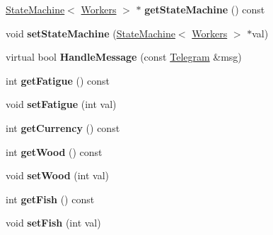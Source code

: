 \begin{DoxyCompactItemize}
\item 
\hypertarget{class_workers_a795643f5e05c591d4172f212ec77da90}{}\hyperlink{class_state_machine}{State\+Machine}$<$ \hyperlink{class_workers}{Workers} $>$ $\ast$ {\bfseries get\+State\+Machine} () const \label{class_workers_a795643f5e05c591d4172f212ec77da90}

\item 
\hypertarget{class_workers_a08cdcac34f5d3225b5faa5276ddc46ef}{}void {\bfseries set\+State\+Machine} (\hyperlink{class_state_machine}{State\+Machine}$<$ \hyperlink{class_workers}{Workers} $>$ $\ast$val)\label{class_workers_a08cdcac34f5d3225b5faa5276ddc46ef}

\item 
\hypertarget{class_workers_ae524c2a46d4c48ad5efcde956af6efe9}{}virtual bool {\bfseries Handle\+Message} (const \hyperlink{struct_telegram}{Telegram} \&msg)\label{class_workers_ae524c2a46d4c48ad5efcde956af6efe9}

\item 
\hypertarget{class_workers_aa0c46bd565afdb6652cf2f16b4ee221d}{}int {\bfseries get\+Fatigue} () const \label{class_workers_aa0c46bd565afdb6652cf2f16b4ee221d}

\item 
\hypertarget{class_workers_abb20740ab6c10e755c2a26896ec989a7}{}void {\bfseries set\+Fatigue} (int val)\label{class_workers_abb20740ab6c10e755c2a26896ec989a7}

\item 
\hypertarget{class_workers_a8f583ae979d5fd3dd80e5c59cd73d090}{}int {\bfseries get\+Currency} () const \label{class_workers_a8f583ae979d5fd3dd80e5c59cd73d090}

\item 
\hypertarget{class_workers_ac13a6bea46802080e06c0882382516dd}{}int {\bfseries get\+Wood} () const \label{class_workers_ac13a6bea46802080e06c0882382516dd}

\item 
\hypertarget{class_workers_a06bcad061d17843b5fb5728ee66ab175}{}void {\bfseries set\+Wood} (int val)\label{class_workers_a06bcad061d17843b5fb5728ee66ab175}

\item 
\hypertarget{class_workers_a7fdce044f9736c88cf0831c9efa9db5b}{}int {\bfseries get\+Fish} () const \label{class_workers_a7fdce044f9736c88cf0831c9efa9db5b}

\item 
\hypertarget{class_workers_a6ae83f7822640cda647414f1cd366b0c}{}void {\bfseries set\+Fish} (int val)\label{class_workers_a6ae83f7822640cda647414f1cd366b0c}


\end{DoxyCompactItemize}
